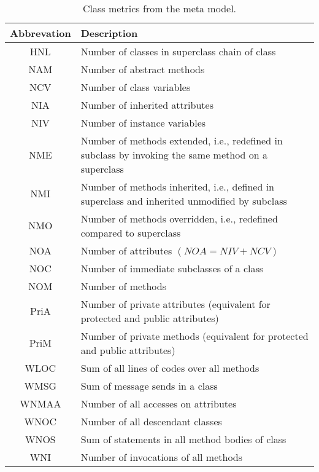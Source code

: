 \begin{table}
	\caption{Class metrics from the meta model.}~\label{tab:classmetrics}
	
	\setlength\tabcolsep{3pt}
	\renewcommand{\arraystretch}{1.4}%
	\begin{tabularx}{\columnwidth}{ | c | p{7cm} | }
		\hline
		Abbrevation & Description \\ \hline\hline
		HNL & Number of classes in superclass chain of class \\ \hline
		NAM & Number of abstract methods \\ \hline
		NCV & Number of class variables \\ \hline
		NIA & Number of inherited attributes \\ \hline
		NIV & Number of instance variables \\ \hline
		NME & Number of methods extended, i.e., redefined in subclass by invoking the same method on a superclass \\ \hline	
		NMI & Number of methods inherited, i.e., defined in superclass and inherited unmodified by subclass\\ \hline
		NMO & Number of methods overridden, i.e., redefined compared to superclass\\ \hline
		NOA & Number of attributes $(NOA = NIV + NCV)$ \\ \hline
		NOC & Number of immediate subclasses of a class \\ \hline
		NOM & Number of methods\\ \hline
		PriA & Number of private attributes (equivalent for protected and public attributes)\\ \hline
		PriM & Number of private methods (equivalent for protected and public attributes)\\ \hline
		WLOC & Sum of all lines of codes over all methods \\ \hline
		WMSG & Sum of message sends in a class\\ \hline
		WNMAA & Number of all accesses on attributes\\ \hline
		WNOC & Number of all descendant classes\\ \hline
		WNOS & Sum of statements in all method bodies of class\\ \hline
		WNI & Number of invocations of all methods \\ \hline
	\end{tabularx}
\end{table}

